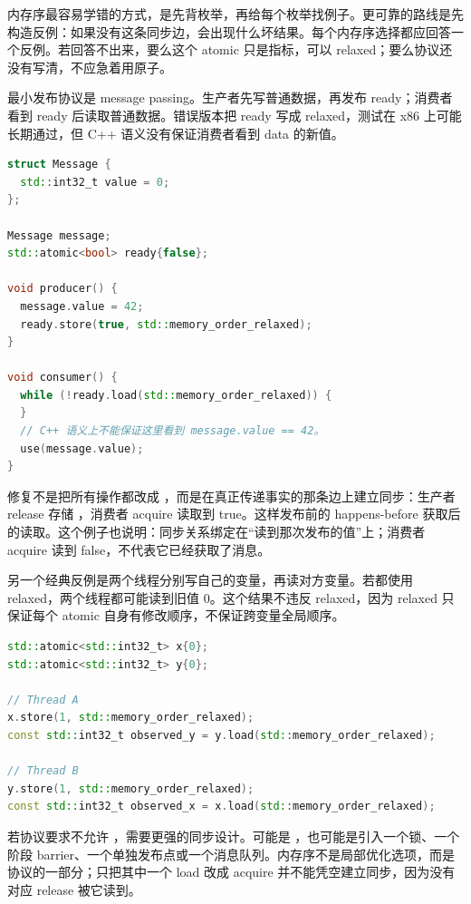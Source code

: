 内存序最容易学错的方式，是先背枚举，再给每个枚举找例子。更可靠的路线是先构造反例：如果没有这条同步边，会出现什么坏结果。每个内存序选择都应回答一个反例。若回答不出来，要么这个 atomic 只是指标，可以 relaxed；要么协议还没有写清，不应急着用原子。

最小发布协议是 message passing。生产者先写普通数据，再发布 ready；消费者看到 ready 后读取普通数据。错误版本把 ready 写成 relaxed，测试在 x86 上可能长期通过，但 C++ 语义没有保证消费者看到 data 的新值。

\begin{lstlisting}[language=C++,caption={错误反例：relaxed ready 没有发布普通数据}]
struct Message {
  std::int32_t value = 0;
};

Message message;
std::atomic<bool> ready{false};

void producer() {
  message.value = 42;
  ready.store(true, std::memory_order_relaxed);
}

void consumer() {
  while (!ready.load(std::memory_order_relaxed)) {
  }
  // C++ 语义上不能保证这里看到 message.value == 42。
  use(message.value);
}
\end{lstlisting}

修复不是把所有操作都改成 ，而是在真正传递事实的那条边上建立同步：生产者 release 存储 ，消费者 acquire 读取到 true。这样发布前的  happens-before 获取后的读取。这个例子也说明：同步关系绑定在“读到那次发布的值”上；消费者 acquire 读到 false，不代表它已经获取了消息。

另一个经典反例是两个线程分别写自己的变量，再读对方变量。若都使用 relaxed，两个线程都可能读到旧值 0。这个结果不违反 relaxed，因为 relaxed 只保证每个 atomic 自身有修改顺序，不保证跨变量全局顺序。

\begin{lstlisting}[language=C++,caption={Store buffering：两个 relaxed 读都看到旧值并不矛盾}]
std::atomic<std::int32_t> x{0};
std::atomic<std::int32_t> y{0};

// Thread A
x.store(1, std::memory_order_relaxed);
const std::int32_t observed_y = y.load(std::memory_order_relaxed);

// Thread B
y.store(1, std::memory_order_relaxed);
const std::int32_t observed_x = x.load(std::memory_order_relaxed);
\end{lstlisting}

若协议要求不允许 ，需要更强的同步设计。可能是 ，也可能是引入一个锁、一个阶段 barrier、一个单独发布点或一个消息队列。内存序不是局部优化选项，而是协议的一部分；只把其中一个 load 改成 acquire 并不能凭空建立同步，因为没有对应 release 被它读到。

